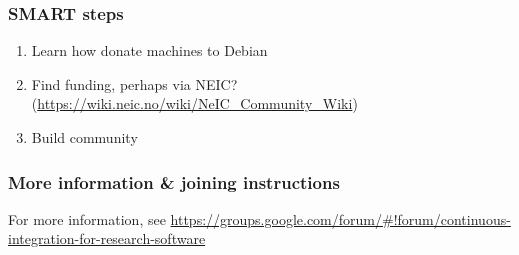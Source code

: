 \subsubsection{SMART steps}

\begin{enumerate}
\item Learn how donate machines to Debian
\item Find funding, perhaps via NEIC? (\url{https://wiki.neic.no/wiki/NeIC_Community_Wiki}) 
\item Build community
\end{enumerate}


\subsubsection{More information \& joining instructions}

For more information, see \url{https://groups.google.com/forum/#!forum/continuous-integration-for-research-software}

